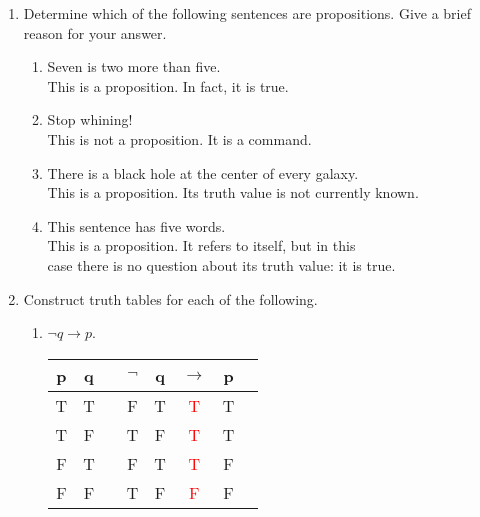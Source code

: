 \documentclass[11pt]{amsart}
\begin{document}
\begin{enumerate}


\item Determine which of the following sentences are propositions. Give a brief reason for your answer.
\begin{enumerate} 

\item Seven is two more than five.\\
{\color{blue} This is a proposition. In fact, it is true.}\\

\item Stop whining!\\
{\color{blue} This is not a proposition. It is a command.}\\

\item There is a black hole at the center of every galaxy.\\
{\color{blue} This is a proposition. Its truth value is not currently known.}\\

\item This sentence has five words. \\[10pt]
{\color{blue} This is a proposition. It refers to itself, but in this\\
case there is no question about its truth value: it is true.}\\

\end{enumerate}


\item Construct truth tables for each of the following.

\begin{enumerate} 

\item $\neg q\longrightarrow p$.\\[3pt]

{\color{blue}
\begin{tabular}{@{ }c@{ }@{ }c  | c@{ }@{ }c@{ }@{ }c@{ }@{ }c@{ }@{ }c@{ }@{ }@{ }c}
p & q &  & $\lnot$ & q & $\rightarrow$ & p & \\
\hline
T & T &  &  F & T & \textcolor{red}{T} &  T & \\
T & F &  & T & F & \textcolor{red}{T} &  T & \\
F & T &  & F &  T & \textcolor{red}{T} &  F & \\
F & F &  &  T & F & \textcolor{red}{F} &  F & \\
\end{tabular}\\[5pt]
}



\end{enumerate}
\end{enumerate}
\end{document}
